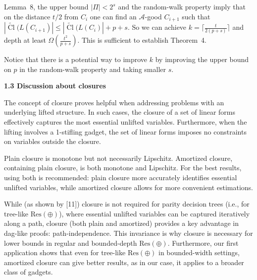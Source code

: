 Lemma 8, the upper bound $|\Pi|<2^{s}$ and the random-walk property imply that on the distance $t/2$ from $C_{i}$ one can find an $\mathcal{A}$-good $C_{i+1}$ such that $|\widetilde{\mathop{\mathrm{Cl}}}(L(C_{i+1})|\leq|\widetilde{\mathop{\mathrm{Cl}}}(L(C_{i})|+p+s$. So we can achieve $k=\lceil\frac{t}{2(p+s)}\rceil$ and depth at least $\Omega\left(\frac{t^{2}}{p+s}\right)$. This is sufficient to establish Theorem 4.\par



Notice that there is a potential way to improve $k$ by improving the upper bound on $p$ in the random-walk property and taking smaller $s$.\par


\par\medskip\noindent\textbf{
1.3 Discussion about closures}\par


The concept of closure proves helpful when addressing problems with an underlying lifted structure. In such cases, the closure of a set of linear forms effectively captures the most essential unlifted variables. Furthermore, when the lifting involves a 1-stifling gadget, the set of linear forms imposes no constraints on variables outside the closure.\par



Plain closure is monotone but not necessarily Lipschitz. Amortized closure, containing plain closure, is both monotone and Lipschitz. For the best results, using both is recommended: plain closure more accurately identifies essential unlifted variables, while amortized closure allows for more convenient estimations.\par



While (as shown by [11]) closure is not required for parity decision trees (i.e., for tree-like $\mathrm{Res}(\oplus)$), where essential unlifted variables can be captured iteratively along a path, closure (both plain and amortized) provides a key advantage in dag-like proofs: path-independence. This invariance is why closure is necessary for lower bounds in regular and bounded-depth $\mathrm{Res}(\oplus)$. Furthermore, our first application shows that even for tree-like $\mathrm{Res}(\oplus)$ in bounded-width settings, amortized closure can give better results, as in our case, it applies to a broader class of gadgets.\par



